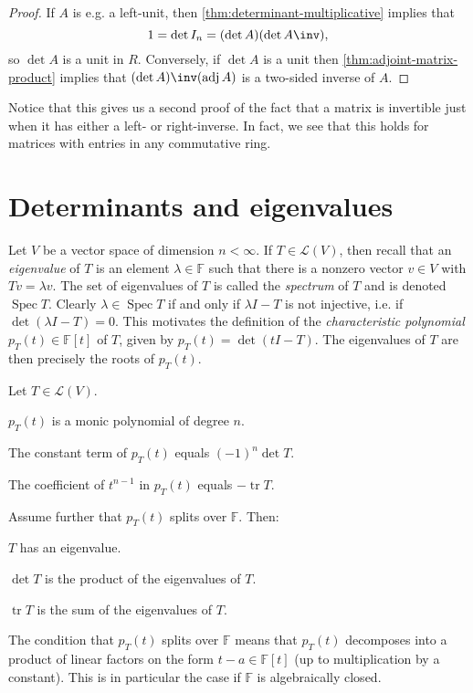 \documentclass[article, a4paper, 11pt, oneside]{memoir}
\numberwithin{equation}{chapter}
\newcommand{\calL}{\mathcal{L}}
\DeclareMathOperator{\adj}{adj}
\DeclareMathOperator{\spec}{Spec}
\DeclareMathOperator{\trace}{tr}
\newcommand{\field}{\mathbb{F}}
\begin{document}
\begin{proof}
    If $A$ is e.g. a left-unit, then \cref{thm:determinant-multiplicative} implies that
    \begin{equation*}
        1
            = \det I_n
            = (\det A)(\det A\inv),
    \end{equation*}
    so $\det A$ is a unit in $R$. Conversely, if $\det A$ is a unit then \cref{thm:adjoint-matrix-product} implies that $(\det A)\inv(\adj A)$ is a two-sided inverse of $A$.
\end{proof}

Notice that this gives us a second proof of the fact that a matrix is invertible just when it has either a left- or right-inverse. In fact, we see that this holds for matrices with entries in any commutative ring.


\section{Determinants and eigenvalues}

Let $V$ be a vector space of dimension $n < \infty$. If $T \in \calL(V)$, then recall that an \emph{eigenvalue} of $T$ is an element $\lambda \in \field$ such that there is a nonzero vector $v \in V$ with $Tv = \lambda v$. The set of eigenvalues of $T$ is called the \emph{spectrum} of $T$ and is denoted $\spec T$. Clearly $\lambda \in \spec T$ if and only if $\lambda I - T$ is not injective, i.e. if $\det(\lambda I - T) = 0$. This motivates the definition of the \emph{characteristic polynomial} $p_T(t) \in \field[t]$ of $T$, given by $p_T(t) = \det(tI - T)$. The eigenvalues of $T$ are then precisely the roots of $p_T(t)$.

\begin{proposition}
    Let $T \in \calL(V)$.
    \begin{enumprop}
        \item $p_T(t)$ is a monic polynomial of degree $n$.
        \item The constant term of $p_T(t)$ equals $(-1)^n \det T$.
        \item The coefficient of $t^{n-1}$ in $p_T(t)$ equals $-\trace T$.
    \end{enumprop}
    Assume further that $p_T(t)$ splits over $\field$. Then:
    \begin{enumprop}[resume]
        \item $T$ has an eigenvalue.
        \item $\det T$ is the product of the eigenvalues of $T$.
        \item $\trace T$ is the sum of the eigenvalues of $T$.
    \end{enumprop}
\end{proposition}
%
The condition that $p_T(t)$ splits over $\field$ means that $p_T(t)$ decomposes into a product of linear factors on the form $t - a \in \field[t]$ (up to multiplication by a constant). This is in particular the case if $\field$ is algebraically closed.
\end{document}
